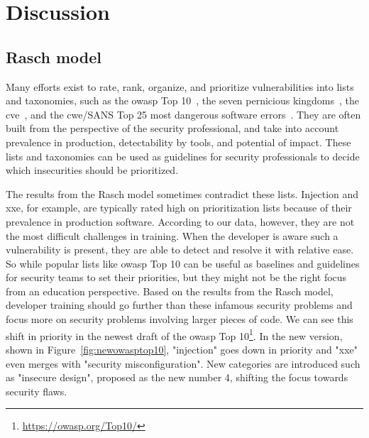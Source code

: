 \section{Discussion}
\label{sec:its-discussion}

\subsection{Rasch model}

Many efforts exist to rate, rank, organize, and prioritize vulnerabilities into lists and taxonomies, such as the \gls{owasp} Top 10~\cite{wichers2017owasp}, the seven pernicious kingdoms~\cite{tsipenyuk2005seven}, the \gls{cve}~\cite{guo2009ontology,mann1999towards}, and the \gls{cwe}/SANS Top 25 most dangerous software errors~\cite{martin20112011}.
They are often built from the perspective of the security professional, and take into account prevalence in production, detectability by tools, and potential of impact.
These lists and taxonomies can be used as guidelines for security professionals to decide which insecurities should be prioritized.

The results from the Rasch model sometimes contradict these lists.
Injection and \gls{xxe}, for example, are typically rated high on prioritization lists because of their prevalence in production software.
According to our data, however, they are not the most difficult challenges in training.
When the developer is aware such a vulnerability is present, they are able to detect and resolve it with relative ease.
So while popular lists like \gls{owasp} Top 10 can be useful as baselines and guidelines for security teams to set their priorities, but they might not be the right focus from an education perspective.
Based on the results from the Rasch model, developer training should go further than these infamous security problems and focus more on security problems involving larger pieces of code.
We can see this shift in priority in the newest draft of the \gls{owasp} Top 10\footnote{\url{https://owasp.org/Top10/}}.
In the new version, shown in Figure~\ref{fig:newowasptop10}, "injection" goes down in priority and "\gls{xxe}" even merges with "security misconfiguration".
New categories are introduced such as "insecure design", proposed as the new number 4, shifting the focus towards security flaws.

